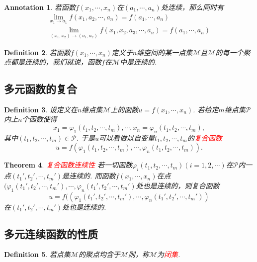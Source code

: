 \documentclass{article}
\newtheorem{theorem}{Theorem}[section]
\newtheorem{definition}[theorem]{Definition}
\newtheorem{annotation}[theorem]{Annotation}
\newcommand{\redt}[1]{\textcolor{red}{#1}}
\begin{document}
\begin{annotation}
\rm 若函数$f(x_1,\cdots,x_n)$在$(a_1,\cdots,a_n)$处连续，那么同时有
$$
\begin{array}{ll}
\lim\limits_{x_1 \to a_1}f(x_1,a_2,\cdots,a_n) = f(a_1,\cdots,a_n) \\
\lim\limits_{(x_1,x_2) \to (a_1,a_2)}f(x_1,x_2,a_3,\cdots,a_n) = f(a_1,\cdots,a_n)
\end{array}
$$
\end{annotation}

\begin{definition}
\rm 若函数$f(x_1,\cdots,x_n)$定义于$n$维空间的某一点集$\mathcal{M}$且$\mathcal{M}$的每一个聚点都是连续的，我们就说，函数$f$在$\mathcal{M}$中是连续的. 
\end{definition}


\subsection{多元函数的复合}

\begin{definition}
\rm 设定义在$n$维点集$\mathcal{M}$上的函数$u = f(x_1,\cdots,x_n)$. 若给定$m$维点集$\mathcal{P}$内上$n$个函数使得
$$
x_1 = \varphi_1(t_1,t_2,\cdots,t_m), \cdots, x_n =\varphi_n(t_1,t_2,\cdots,t_m),
$$
其中$(t_1,t_2,\cdots,t_m) \in \mathcal{P}$. 于是$u$可以看做以自变量$t_1,t_2,\cdots,t_m$的\redt{复合函数}
$$
u = f(\varphi_1(t_1,t_2,\cdots,t_m),\cdots,\varphi_n(t_1,t_2,\cdots,t_m)).
$$
\end{definition}


\begin{theorem}
\rm \redt{复合函数连续性} 若一切函数$\varphi_i(t_1,t_2,\cdots,t_m)(i=1,2,\cdots)$在$\mathcal{P}$内一点$(t_1',t_2',\cdots,t_m')$是连续的. 而函数$f(x_1, \cdots,x_n)$在点$(\varphi_1(t_1',t_2',\cdots,t_m'),\cdots,\varphi_n(t_1',t_2',\cdots,t_m')$处也是连续的，则复合函数
$$
u = f((\varphi_1(t_1',t_2',\cdots,t_m'),\cdots,\varphi_n(t_1',t_2',\cdots,t_m'))
$$
在$(t_1',t_2',\cdots,t_m')$处也是连续的. 
\end{theorem}

\subsection{多元连续函数的性质}

\begin{definition}
\rm 若点集$\mathcal{M}$的聚点均含于$\mathcal{M}$则，称$\mathcal{M}$为\redt{闭集}.
\end{definition}
\end{document}
